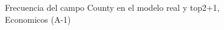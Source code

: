 \begin{figure}[H]
    \centering
    
    \caption{Frecuencia del campo County en el modelo real y top2+1, Economicos (A-1)}
    \label{frecuency-County-top2+1}
\end{figure}